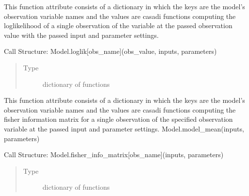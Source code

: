 \documentclass[letterpaper,10pt,english,openany,oneside]{sphinxmanual}
\begin{document}
\begin{fulllineitems}
\begin{fulllineitems}
\begin{quote}
\begin{description}
\end{description}\end{quote}

\end{fulllineitems}


\begin{fulllineitems}
\label{\detokenize{nloed:nloed.model.Model.loglik}}
This function attribute consists of a dictionary in which
the keys are the model’s observation variable names and the values are casadi functions
computing the loglikelihood of a single observation of the variable at the passed
observation value with the passed input and parameter settings.

Call Structure: Model.loglik{[}obs\_name{]}(obs\_value, inputs, parameters)
\begin{quote}\begin{description}
\item[{Type}] \leavevmode
dictionary of functions

\end{description}\end{quote}

\end{fulllineitems}


\begin{fulllineitems}
\label{\detokenize{nloed:nloed.model.Model.fisher_info_matrix}}
This function attribute consists of a
dictionary in which the keys are the model’s observation variable names and the values
are casadi functions computing the fisher information matrix for a single observation of
the specified observation variable at the passed input and parameter settings.
Model.model\_mean(inputs, parameters)

Call Structure: Model.fisher\_info\_matrix{[}obs\_name{]}(inputs, parameters)
\begin{quote}\begin{description}
\item[{Type}] \leavevmode
dictionary of functions

\end{description}\end{quote}


\end{fulllineitems}
\end{fulllineitems}
\end{document}

